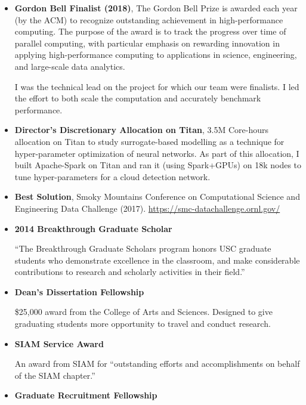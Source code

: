 \documentclass{article}
\begin{document}
	\begin{itemize}
        \item \textbf{Gordon Bell Finalist (2018)},
        The Gordon Bell Prize is awarded each year (by the ACM) to recognize outstanding
        achievement in high-performance computing. The purpose of the award is to track the
        progress over time of parallel computing, with particular emphasis on rewarding 
        innovation in applying high-performance computing to applications in science,
        engineering, and large-scale data analytics.
        
        I was the technical lead on the project for which our team were finalists.
        I led the effort to both scale the computation and accurately benchmark performance.

		\item \textbf{Director's Discretionary Allocation on Titan}, 3.5M Core-hours allocation on Titan to
        study surrogate-based modelling as a technique for hyper-parameter optimization of neural networks.
        As part of this allocation, I built Apache-Spark on Titan and ran it (using Spark+GPUs) on 18k nodes
        to tune hyper-parameters for a cloud detection network.

        \item \textbf{Best Solution}, Smoky Mountains Conference on Computational Science and Engineering
		Data Challenge (2017).  \url{https://smc-datachallenge.ornl.gov/}

		\item \textbf{2014 Breakthrough Graduate Scholar}

		``The Breakthrough Graduate Scholars program honors USC graduate students who demonstrate excellence in the classroom, and make considerable
		contributions to research and scholarly activities in their field.''

		\item \textbf{Dean's Dissertation Fellowship}

		\$25,000 award from the College of Arts and Sciences.
		Designed to give graduating students more opportunity to travel and conduct research.

		\item \textbf{SIAM Service Award}

		An award from SIAM for ``outstanding efforts and accomplishments on behalf of the SIAM chapter.''

		\item \textbf{Graduate Recruitment Fellowship}
        

\end{itemize}
\end{document}
